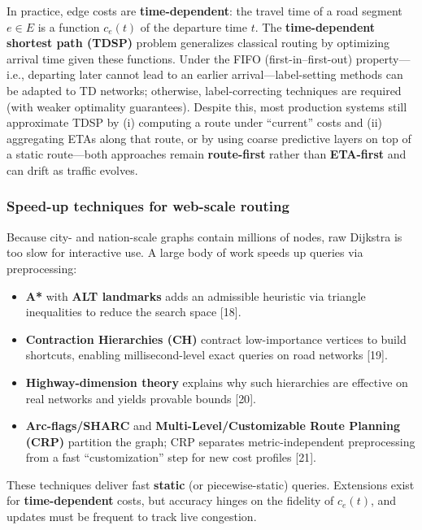 \documentclass[
  10pt,
  letterpaper,
  lettersize,
  journal]{IEEEtran}
\providecommand{\tightlist}{%
  \setlength{\itemsep}{0pt}\setlength{\parskip}{0pt}}\usepackage{longtable,booktabs,array}
\begin{document}
In practice, edge costs are \textbf{time-dependent}: the travel time of
a road segment \(e\in E\) is a function \(c_e(t)\) of the departure time
\(t\). The \textbf{time-dependent shortest path (TDSP)} problem
generalizes classical routing by optimizing arrival time given these
functions. Under the FIFO (first-in--first-out) property---i.e.,
departing later cannot lead to an earlier arrival---label-setting
methods can be adapted to TD networks; otherwise, label-correcting
techniques are required (with weaker optimality guarantees). Despite
this, most production systems still approximate TDSP by (i) computing a
route under ``current'' costs and (ii) aggregating ETAs along that
route, or by using coarse predictive layers on top of a static
route---both approaches remain \textbf{route-first} rather than
\textbf{ETA-first} and can drift as traffic evolves.

\subsubsection{Speed-up techniques for web-scale
routing}\label{speed-up-techniques-for-web-scale-routing}

Because city- and nation-scale graphs contain millions of nodes, raw
Dijkstra is too slow for interactive use. A large body of work speeds up
queries via preprocessing:

\begin{itemize}
\tightlist
\item
  \textbf{A*} with \textbf{ALT landmarks} adds an admissible heuristic
  via triangle inequalities to reduce the search space {[}18{]}.\\
\item
  \textbf{Contraction Hierarchies (CH)} contract low-importance vertices
  to build shortcuts, enabling millisecond-level exact queries on road
  networks {[}19{]}.\\
\item
  \textbf{Highway-dimension theory} explains why such hierarchies are
  effective on real networks and yields provable bounds {[}20{]}.\\
\item
  \textbf{Arc-flags/SHARC} and \textbf{Multi-Level/Customizable Route
  Planning (CRP)} partition the graph; CRP separates metric-independent
  preprocessing from a fast ``customization'' step for new cost profiles
  {[}21{]}.
\end{itemize}

These techniques deliver fast \textbf{static} (or piecewise-static)
queries. Extensions exist for \textbf{time-dependent} costs, but
accuracy hinges on the fidelity of \(c_e(t)\), and updates must be
frequent to track live congestion.
\end{document}
